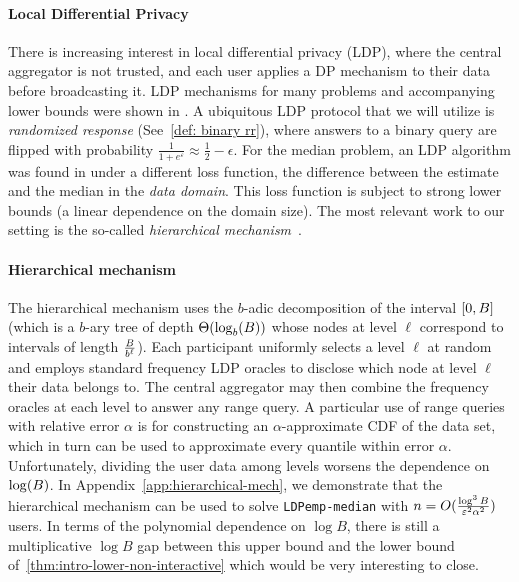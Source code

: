 \paragraph{Local Differential Privacy} There is increasing interest in local differential privacy (LDP), where the central aggregator is not trusted, and each user applies a DP mechanism to their data before broadcasting it. LDP mechanisms for many problems and accompanying lower bounds were shown in \cite{duchi2013local}. A ubiquitous LDP protocol that we will utilize is \emph{randomized response} (See~\cref{def: binary rr}), where answers to a binary query are flipped with probability $\frac{1}{1+e^\varepsilon} \approx \frac{1}{2}-\epsilon$. For the median problem, an LDP algorithm was found in \cite{duchi2018minimax} under a different loss function, the difference between the estimate and the median in the \emph{data domain}. This loss function is subject to strong lower bounds (a linear dependence on the domain size). %
The most relevant work to our setting is the so-called \emph{hierarchical mechanism}~\cite{kulkarni2019answering}.
%

\paragraph{Hierarchical mechanism} 
%
The hierarchical mechanism uses the $b$-adic decomposition of the interval $[0,B]$ (which is a $b$-ary tree of depth $\Theta(\log_b(B))$ whose nodes at level $\ell$ correspond to intervals of length $\frac{B}{b^\ell}$). Each participant uniformly selects a level $\ell$ at random and employs standard frequency LDP oracles \cite{bassily2015local,wang2017locally} to disclose which node at level $\ell$ their data belongs to. The central aggregator may then combine the frequency oracles at each level to answer any range query. 
%
%
A particular use of range queries with relative error $\alpha$ is for constructing an $\alpha$-approximate CDF of the data set, which in turn can be used to approximate every quantile within error $\alpha$. Unfortunately, dividing the user data among levels worsens the dependence on $\log(B)$. In Appendix~\ref{app:hierarchical-mech}, we demonstrate that the hierarchical mechanism can be used to solve \texttt{LDPemp-median} with $n =O(\frac{\log^3 B}{\varepsilon^2 \alpha^2})$ users. %
%
In terms of the polynomial dependence on $\log B$, there is still a multiplicative $\log B$ gap between this upper bound and the lower bound of~\cref{thm:intro-lower-non-interactive} which would be very interesting to close.

